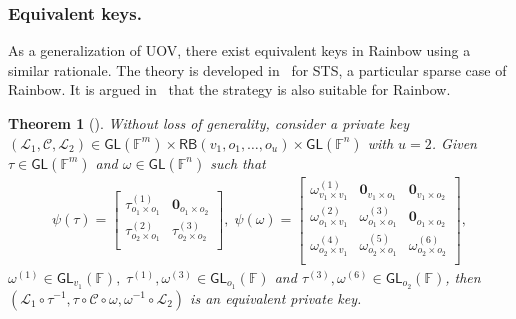 \documentclass[english]{ufsc-thesis-rn46-2019/ufsc-thesis-rn46-2019}
\newtheorem{theorem}{Theorem}[section]
\theoremstyle{definition}
\begin{document}
\subsubsection{Equivalent keys.}

As a generalization of UOV, there exist equivalent keys in Rainbow using
a similar rationale. The theory is developed in~\cite[Sec.~4.4]{Wolf:201104}
for STS, a particular sparse case of Rainbow. It is argued
in~\cite{Petzoldt:201307} that the strategy is also suitable for Rainbow.

\begin{theorem}[{\cite[Thm.~4.17]{Wolf:201104}}]
  Without loss of generality, consider a private key
  $(\mathcal{L}_{1}, \mathcal{C}, \mathcal{L}_{2})
    \in \mathsf{GL}(\mathbb{F}^{m})
    \times \mathsf{RB}(v_{1}, o_{1}, \dots, o_{u})
    \times \mathsf{GL}(\mathbb{F}^{n})$
  with $u = 2$. Given $\tau \in \mathsf{GL}(\mathbb{F}^{m})$ and
  $\omega \in \mathsf{GL}(\mathbb{F}^{n})$ such that
  \begin{align}
    \psi(\tau) =
    \begin{bmatrix}
      \tau_{o_{1} \times o_{1}}^{(1)} & \mathbf{0}_{o_{1} \times o_{2}} \\
      \tau_{o_{2} \times o_{1}}^{(2)} & \tau_{o_{2} \times o_{2}}^{(3)} \\
    \end{bmatrix},\;
    \psi(\omega) =
    \begin{bmatrix}
      \omega_{v_{1} \times v_{1}}^{(1)} & \mathbf{0}_{v_{1} \times o_{1}}
        & \mathbf{0}_{v_{1} \times o_{2}}   \\
      \omega_{o_{1} \times v_{1}}^{(2)} & \omega_{o_{1} \times o_{1}}^{(3)}
        & \mathbf{0}_{o_{1} \times o_{2}}   \\
      \omega_{o_{2} \times v_{1}}^{(4)} & \omega_{o_{2} \times o_{1}}^{(5)}
        & \omega_{o_{2} \times o_{2}}^{(6)} \\
    \end{bmatrix},
  \end{align}
  $\omega^{(1)} \in \mathsf{GL}_{v_{1}}(\mathbb{F}),\;
    \tau^{(1)}, \omega^{(3)} \in \mathsf{GL}_{o_{1}}(\mathbb{F})$
  and $\tau^{(3)}, \omega^{(6)} \in \mathsf{GL}_{o_{2}}(\mathbb{F})$, then
  $(\mathcal{L}_{1} \circ \tau^{-1}, \tau \circ \mathcal{C} \circ \omega,
    \omega^{-1} \circ \mathcal{L}_{2})$ is an equivalent private key.
\end{theorem}
\end{document}
